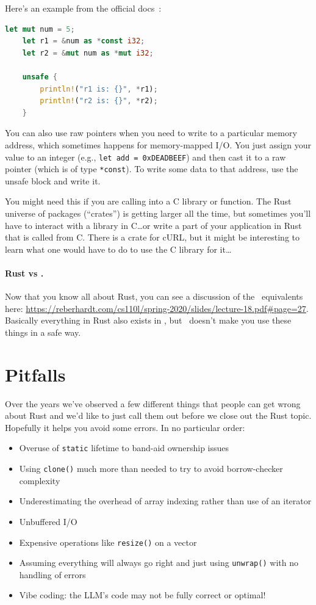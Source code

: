 Here's an example from the official docs~\cite{rustdocs}:
\begin{lstlisting}[language=Rust]
    let mut num = 5;
    let r1 = &num as *const i32;
    let r2 = &mut num as *mut i32;

    unsafe {
        println!("r1 is: {}", *r1);
        println!("r2 is: {}", *r2);
    }
\end{lstlisting}

You can also use raw pointers when you need to write to a particular memory address, which sometimes happens for memory-mapped I/O. You just assign your value to an integer (e.g., \texttt{let add = 0xDEADBEEF}) and then cast it to a raw pointer (which is of type \texttt{*const}). To write some data to that address, use the unsafe block and write it.

You might need this if you are calling into a C library or function. The Rust universe of packages (``crates'') is getting larger all the time, but sometimes you'll have to interact with a library in C\ldots or write a part of your application in Rust that is called from C. There is a crate for cURL, but it might be interesting to learn what one would have to do to use the C library for it\ldots

\paragraph{Rust vs \CPP.} Now that you know all about Rust, you can see a discussion of the \CPP~equivalents here: \url{https://reberhardt.com/cs110l/spring-2020/slides/lecture-18.pdf#page=27}. Basically everything in Rust also exists in \CPP, but \CPP~doesn't make you use these things in a safe way.

\section*{Pitfalls}
Over the years we've observed a few different things that people can get wrong about Rust and we'd like to just call them out before we close out the Rust topic. Hopefully it helps you avoid some errors. In no particular order:

\begin{itemize}
	\item Overuse of \texttt{static} lifetime to band-aid ownership issues
	\item Using \texttt{clone()} much more than needed to try to avoid borrow-checker complexity
	\item Underestimating the overhead of array indexing rather than use of an iterator
	\item Unbuffered I/O
	\item Expensive operations like \texttt{resize()} on a vector
	\item Assuming everything will always go right and just using \texttt{unwrap()} with no handling of errors
	\item Vibe coding: the LLM's code may not be fully correct or optimal!
\end{itemize} 

